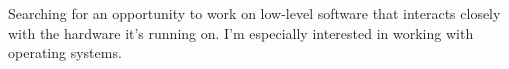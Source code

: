 
\begin{cvparagraph}
Searching for an opportunity to work on low-level software that interacts closely with the hardware it's running on. I'm especially interested in working with operating systems.
\end{cvparagraph}

